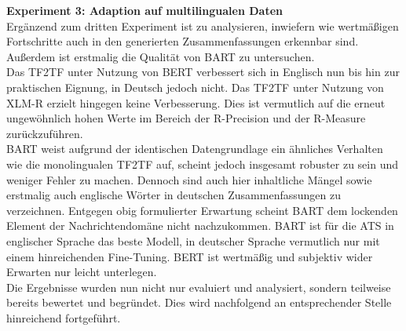 \noindent
\textbf{Experiment 3: Adaption auf multilingualen Daten}\\
\noindent
Ergänzend zum dritten Experiment ist zu analysieren, inwiefern wie wertmäßigen Fortschritte auch in den generierten Zusammenfassungen erkennbar sind. Außerdem ist erstmalig die Qualität von \ac{BART} zu untersuchen.\\

\noindent
Das \ac{TF2TF} unter Nutzung von \ac{BERT} verbessert sich in Englisch nun bis hin zur praktischen Eignung, in Deutsch jedoch nicht. Das \ac{TF2TF} unter Nutzung von \ac{XLM-R} erzielt hingegen keine Verbesserung. Dies ist vermutlich auf die erneut ungewöhnlich hohen Werte im Bereich der R-Precision und der R-Measure zurückzuführen.\\

\noindent
\ac{BART} weist aufgrund der identischen Datengrundlage ein ähnliches Verhalten wie die monolingualen \ac{TF2TF} auf, scheint jedoch insgesamt robuster zu sein und weniger Fehler zu machen. Dennoch sind auch hier inhaltliche Mängel sowie erstmalig auch englische Wörter in deutschen Zusammenfassungen zu verzeichnen. Entgegen obig formulierter Erwartung scheint \ac{BART} dem lockenden Element der Nachrichtendomäne nicht nachzukommen. \ac{BART} ist für die \ac{ATS} in englischer Sprache das beste Modell, in deutscher Sprache vermutlich nur mit einem hinreichenden Fine-Tuning. \ac{BERT} ist wertmäßig und subjektiv wider Erwarten nur leicht unterlegen.\\

\noindent
Die Ergebnisse wurden nun nicht nur evaluiert und analysiert, sondern teilweise bereits bewertet und begründet. Dies wird nachfolgend an entsprechender Stelle hinreichend fortgeführt.
